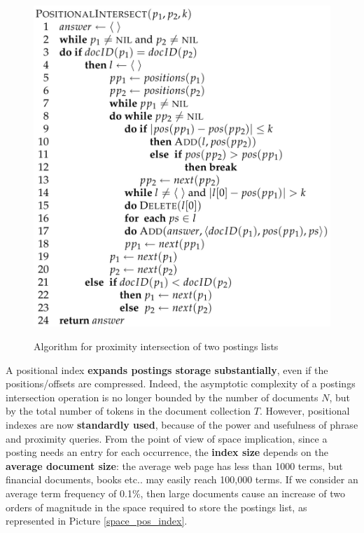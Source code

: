 \begin{figure}[h!]
		\centering
		\includegraphics[scale = 0.8]{img/positional_intersect.jpg}
		\label{pos_intersect}
        \caption{Algorithm for proximity intersection of two postings lists}
\end{figure}

A positional index \textbf{expands postings storage substantially}, even if the positions/offsets are compressed. Indeed, the asymptotic complexity of a postings intersection operation is no longer bounded by the number of documents $N$, but by the total number of tokens in the document collection $T$. However, positional indexes are now \textbf{standardly used}, because of the power and usefulness of phrase and proximity queries. From the point of view of space implication, since a posting needs an entry for each occurrence, the \textbf{index size} depends on the \textbf{average document size}: the average web page has less than 1000 terms, but financial documents, books etc.. may easily reach 100,000 terms. If we consider an average term frequency of 0.1\%, then large documents cause an increase of two orders of magnitude in the space required to store the postings list, as represented in Picture \ref{space_pos_index}.

